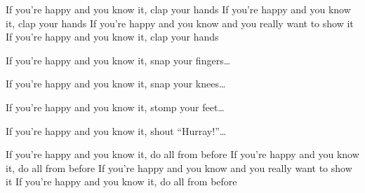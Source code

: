 \beginverse
If you're happy and you know it, clap your hands
If you're happy and you know it, clap your hands
If you're happy and you know and you really want to show it
If you're happy and you know it, clap your hands
\endverse

\beginverse
If you're happy and you know it, snap your fingers\dots
\endverse

\beginverse
If you're happy and you know it, snap your knees\dots
\endverse

\beginverse
If you're happy and you know it, stomp your feet\dots
\endverse

\beginverse
If you're happy and you know it, shout ``Hurray!''\dots
\endverse

\beginverse
If you're happy and you know it, do all from before
If you're happy and you know it, do all from before
If you're happy and you know and you really want to show it
If you're happy and you know it, do all from before
\endverse
\endsong
